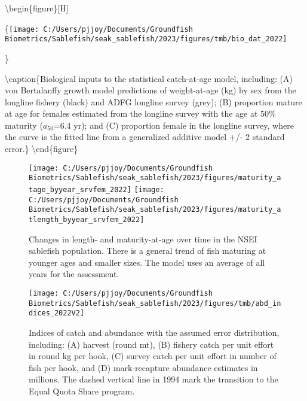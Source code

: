 \documentclass[
]{article}
\begin{document}
\textbackslash begin\{figure\}{[}H{]}

\{\centering \texttt{[image: C:/Users/pjjoy/Documents/Groundfish Biometrics/Sablefish/seak\_sablefish/2023/figures/tmb/bio\_dat\_2022]}

\}

\textbackslash caption\{Biological inputs to the statistical
catch-at-age model, including: (A) von Bertalanffy growth model
predictions of weight-at-age (kg) by sex from the longline fishery
(black) and ADFG longline survey (grey); (B) proportion mature at age
for females estimated from the longline survey with the age at 50\%
maturity (\(a_{50}\)=6.4 yr); and (C) proportion female in the longline
survey, where the curve is the fitted line from a generalized additive
model +/- 2 standard error.\}\label{fig:bioinputs}
\textbackslash end\{figure\}

\begin{figure}[H]

{\centering \texttt{[image: C:/Users/pjjoy/Documents/Groundfish Biometrics/Sablefish/seak\_sablefish/2023/figures/maturity\_atage\_byyear\_srvfem\_2022]} \texttt{[image: C:/Users/pjjoy/Documents/Groundfish Biometrics/Sablefish/seak\_sablefish/2023/figures/maturity\_atlength\_byyear\_srvfem\_2022]} 

}

\caption{Changes in length- and maturity-at-age over time in the NSEI sablefish population.  There is a general trend of fish maturing at younger ages and smaller sizes.  The model uses an average of all years for the assessment.}\label{fig:deltamat}
\end{figure}

\begin{figure}[H]

{\centering \texttt{[image: C:/Users/pjjoy/Documents/Groundfish Biometrics/Sablefish/seak\_sablefish/2023/figures/tmb/abd\_indices\_2022V2]} 

}

\caption{Indices of catch and abundance with the assumed error distribution, including: (A) harvest (round mt), (B) fishery catch per unit effort in round kg per hook, (C) survey catch per unit effort in number of fish per hook, and (D) mark-recapture abundance estimates in millions. The dashed vertical line in 1994 mark the transition to the Equal Quota Share program.}\label{fig:abdind}
\end{figure}
\end{document}
